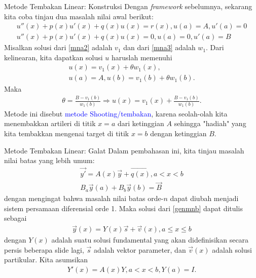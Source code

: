 \documentclass[xcolor={dvipsnames}, 9pt]{beamer}
\renewcommand{\emph}[1]{\textcolor{Blue}{#1}}
\begin{document}
	\begin{frame}{Metode Tembakan Linear: Konstruksi}
		Dengan \textit{framework} sebelumnya, sekarang kita coba tinjau dua masalah nilai awal berikut:
		\begin{gather}
			u''(x) + p(x)u'(x) + q(x)u(x) = r(x), u(a) = A, u'(a) = 0 \label{mna2}\\
			u''(x) + p(x)u'(x) + q(x)u(x) = 0, u(a) = 0, u'(a) = B \label{mna3}
		\end{gather}
		Misalkan solusi dari \eqref{mna2} adalah $v_1$ dan dari \eqref{mna3} adalah $w_1$. Dari kelinearan, kita dapatkan solusi $u$ haruslah memenuhi
		\begin{align*}
			u(x) = v_1(x) + \theta w_1(x), \\
			u(a) = A, u(b) = v_1(b) + \theta w_1(b).
		\end{align*} 
		Maka
		\begin{align*}
			\theta = \frac{B - v_1(b)}{w_1(b)} \Rightarrow u(x) = v_1(x) + \frac{B - v_1(b)}{w_1(b)}.
		\end{align*}
		Metode ini disebut \emph{metode Shooting/tembakan}, karena seolah-olah kita menembakkan artileri di titik $x=a$ dari ketinggian $A$ sehingga "hadiah" yang kita tembakkan mengenai target di titik $x=b$ dengan ketinggian $B$.
	\end{frame}
	\begin{frame}{Metode Tembakan Linear: Galat}
		Dalam pembahasan ini, kita tinjau masalah nilai batas yang lebih umum:
		\begin{gather}
			\vec{y'} = A(x)\vec{y} + \vec{q(x)}, a<x<b \nonumber \\
			B_a\vec{y}(a) + B_b\vec{y}(b) = \vec{B} \label{genmnb}
		\end{gather}
		dengan mengingat bahwa masalah nilai batas orde-$n$ dapat diubah menjadi sistem persamaan diferensial orde 1. Maka solusi dari \eqref{genmnb} dapat ditulis sebagai
		\begin{align*}
			\vec{y}(x) = Y(x)\vec{s} + \vec{v}(x), a\leq x\leq b
		\end{align*}
		dengan $Y(x)$ adalah suatu solusi fundamental yang akan didefinisikan secara persis beberapa slide lagi, $\vec{s}$ adalah vektor parameter, dan $\vec{v}(x)$ adalah solusi partikular. Kita asumsikan
		\begin{align*}
			Y'(x) = A(x)Y, a<x<b, Y(a) = I.
		\end{align*} 
	\end{frame}
\end{document}
